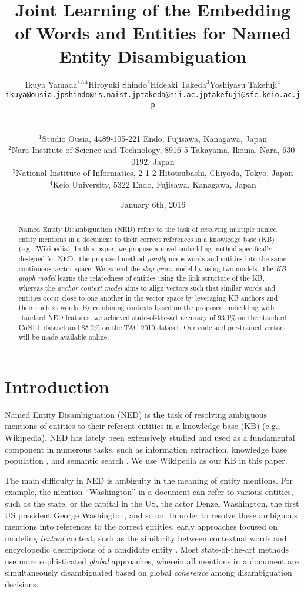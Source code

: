 \documentclass[11pt,letterpaper]{article}
\title{Joint Learning of the Embedding of Words and Entities for Named Entity Disambiguation}
\author{
  \begin{tabular}{C{3.3cm} C{3.5cm} C{3.1cm} C{4.5cm}}
  Ikuya Yamada$^{1\,3\,4}$ & Hiroyuki Shindo$^2$ & Hideaki Takeda$^3$ & Yoshiyasu Takefuji$^4$ \\
  {\tt \footnotesize{ikuya@ousia.jp}} & {\tt \footnotesize{shindo@is.naist.jp}} & {\tt \footnotesize{takeda@nii.ac.jp}} & {\tt \footnotesize{takefuji@sfc.keio.ac.jp}} \\
  \end{tabular}
  \\
  \\
  {\normalsize $^1$Studio Ousia, 4489-105-221 Endo, Fujisawa, Kanagawa, Japan} \\
  {\normalsize $^2$Nara Institute of Science and Technology, 8916-5 Takayama, Ikoma, Nara, 630-0192, Japan} \\
  {\normalsize $^3$National Institute of Informatics, 2-1-2 Hitotsubashi, Chiyoda, Tokyo, Japan} \\
  {\normalsize $^4$Keio University, 5322 Endo, Fujisawa, Kanagawa, Japan}
}
\date{January 6th, 2016}
\begin{document}
%
\maketitle
%
\begin{abstract}
Named Entity Disambiguation (NED) refers to the task of resolving multiple named entity mentions in a document to their correct references in a knowledge base (KB) (e.g., Wikipedia).
In this paper, we propose a novel embedding method specifically designed for NED.
The proposed method \textit{jointly} maps words and entities into the same continuous vector space.
We extend the \textit{skip-gram} model by using two models.
The \textit{KB graph model} learns the relatedness of entities using the link structure of the KB, whereas the \textit{anchor context model} aims to align vectors such that similar words and entities occur close to one another in the vector space by leveraging KB anchors and their context words.
By combining contexts based on the proposed embedding with standard NED features, we achieved state-of-the-art accuracy of 93.1\% on the standard CoNLL dataset and 85.2\% on the TAC 2010 dataset.
Our code and pre-trained vectors will be made available online.
\end{abstract}
%
\section{Introduction}
\label{sec:introduction}

Named Entity Disambiguation (NED) is the task of resolving ambiguous mentions of entities to their referent entities in a knowledge base (KB) (e.g., Wikipedia).
NED has lately been extensively studied \cite{Cucerzan2007,Mihalcea2007,Milne2008,Ratinov2011} and used as a fundamental component in numerous tasks, such as information extraction, knowledge base population \cite{McNamee2009,Ji2010}, and semantic search \cite{Blanco2015a}.
We use Wikipedia as our KB in this paper.

The main difficulty in NED is ambiguity in the meaning of entity mentions.
For example, the mention ``Washington'' in a document can refer to various entities, such as the state, or the capital in the US, the actor \textsf{Denzel Washington}, the first US president \textsf{George Washington}, and so on.
In order to resolve these ambiguous mentions into references to the correct entities, early approaches focused on modeling \textit{textual} context, such as the similarity between contextual words and encyclopedic descriptions of a candidate entity \cite{Bunescu2006,Mihalcea2007}.
Most state-of-the-art methods use more sophisticated \textit{global} approaches, wherein all mentions in a document are simultaneously disambiguated based on global \textit{coherence} among disambiguation decisions.
\end{document}

